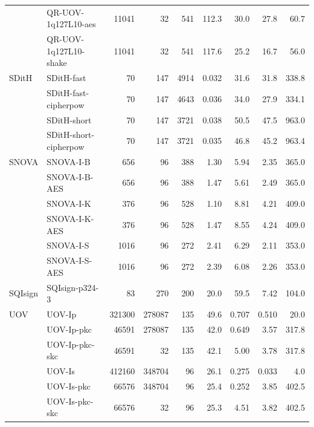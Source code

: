\begin{table}[t]
\begin{tabular}{llrrrrrrr}
 & QR-UOV-1q127L10-aes & 11041 & 32 & 541 & 112.3 & 30.0 & 27.8 & 60.7 \\
 & QR-UOV-1q127L10-shake & 11041 & 32 & 541 & 117.6 & 25.2 & 16.7 & 56.0 \\
\midrule
SDitH & SDitH-fast & 70 & 147 & 4914 & 0.032 & 31.6 & 31.8 & 338.8 \\
 & SDitH-fast-cipherpow & 70 & 147 & 4643 & 0.036 & 34.0 & 27.9 & 334.1 \\
 & SDitH-short & 70 & 147 & 3721 & 0.038 & 50.5 & 47.5 & 963.0 \\
 & SDitH-short-cipherpow & 70 & 147 & 3721 & 0.035 & 46.8 & 45.2 & 963.4 \\
\midrule
SNOVA & SNOVA-I-B & 656 & 96 & 388 & 1.30 & 5.94 & 2.35 & 365.0 \\
 & SNOVA-I-B-AES & 656 & 96 & 388 & 1.47 & 5.61 & 2.49 & 365.0 \\
 & SNOVA-I-K & 376 & 96 & 528 & 1.10 & 8.81 & 4.21 & 409.0 \\
 & SNOVA-I-K-AES & 376 & 96 & 528 & 1.47 & 8.55 & 4.24 & 409.0 \\
 & SNOVA-I-S & 1016 & 96 & 272 & 2.41 & 6.29 & 2.11 & 353.0 \\
 & SNOVA-I-S-AES & 1016 & 96 & 272 & 2.39 & 6.08 & 2.26 & 353.0 \\
\midrule
SQIsign & SQIsign-p324-3 & 83 & 270 & 200 & 20.0 & 59.5 & 7.42 & 104.0 \\
\midrule
UOV & UOV-Ip & 321300 & 278087 & 135 & 49.6 & 0.707 & 0.510 & 20.0 \\
 & UOV-Ip-pkc & 46591 & 278087 & 135 & 42.0 & 0.649 & 3.57 & 317.8 \\
 & UOV-Ip-pkc-skc & 46591 & 32 & 135 & 42.1 & 5.00 & 3.78 & 317.8 \\
 & UOV-Is & 412160 & 348704 & 96 & 26.1 & 0.275 & 0.033 & 4.0 \\
 & UOV-Is-pkc & 66576 & 348704 & 96 & 25.4 & 0.252 & 3.85 & 402.5 \\
 & UOV-Is-pkc-skc & 66576 & 32 & 96 & 25.3 & 4.51 & 3.82 & 402.5 \\
\bottomrule
\end{tabular}
\end{table}
